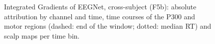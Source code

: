 \begin{figure}[H]
\centering
{}
\caption{Integrated Gradients of EEGNet, cross-subject (F5b): absolute attribution by channel and time, time courses of the P300 and motor regions (dashed: end of the  window; dotted: median RT) and scalp maps per time bin.}
\label{fig:rq3-ig}
\end{figure}
